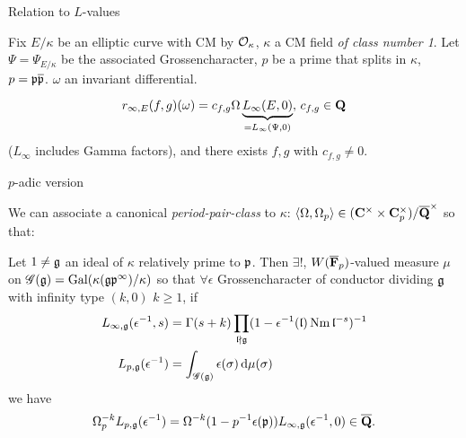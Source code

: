 \begin{frame}{Relation to \(L\)-values}

Fix \(E/ \kappa\) be an elliptic curve with CM by \(\mathcal{O}_\kappa\), \(\kappa\) a CM field \emph{of class number 1}. Let \( \Psi = \Psi_{E/\kappa}\) be the associated Grossencharacter, \(p\) be a prime that splits in \(\kappa\), \(p = \mathfrak{p} \overline{\mathfrak{p} }\). \(\omega\) an invariant differential.%

\begin{proposition}

\begin{equation*}
r_{\infty,E}(f,g)(\omega) = c_{f,g} \Omega \underbrace{L_\infty (E, 0)}_{= L_\infty(\Psi,0)},\, c_{f,g} \in \mathbf Q
\end{equation*}
(\(L_\infty\) includes Gamma factors), and there exists \(f,g\) with \(c_{f,g} \ne 0\).%
\end{proposition}
\end{frame}

\begin{frame}{\(p\)-adic version}

%
We can associate a canonical \emph{period-pair-class} to \(\kappa\): %
\(
\langle \Omega , \Omega_p \rangle  \in (\mathbf C^\times \times \mathbf C_p^\times) / \overline {\mathbf Q} ^\times
\)
so that:
\begin{theorem}
    Let \(1 \ne \mathfrak{g}\) an ideal of \( \kappa\) relatively prime to \(\mathfrak{p}\). Then \(\exists! \), \(W(\overline {\mathbf F}_p)\)-valued measure \(\mu\) on
    \(
\mathscr G(\mathfrak{g}) = \operatorname{Gal}(\kappa(\mathfrak{g} \mathfrak{p}^\infty)/\kappa)
\)
so that \(\forall \epsilon\) Grossencharacter of conductor dividing \(\mathfrak{g}\) with infinity type \((k,0)\) \(k\ge 1\), if%
\begin{align*}
L_{\infty,\mathfrak{g}}(\epsilon ^{-1}, s) &= \Gamma(s+ k) \prod_{\mathfrak{l} \nmid \mathfrak{g}} (1- \epsilon ^{-1} (\mathfrak{l}) \operatorname{Nm} \mathfrak{l}^{-s})^{-1}\\
L_{p,\mathfrak{g}} (\epsilon^{-1})         &= \int_{\mathscr G(\mathfrak{g})} \epsilon(\sigma) \mathop{}\!\mathrm{d} \mu(\sigma)
\end{align*}
we have%
\begin{equation*}
\Omega_p^{-k} L_{p,\mathfrak{g}}( \epsilon ^{-1}) = \Omega^{-k}(1 - p^{-1} \epsilon ( \mathfrak{p} )) L_{\infty, \mathfrak{g}}(\epsilon ^{-1}, 0) \in \overline {\mathbf Q}\text{.}
\end{equation*}
\end{theorem}
\end{frame}

